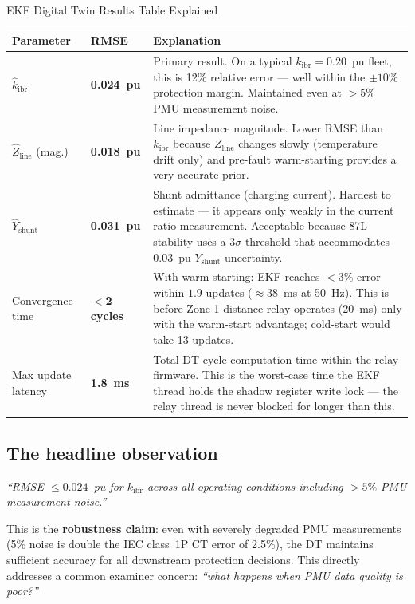 \documentclass[12pt,a4paper]{article}
\begin{document}
\begin{resultbox}{EKF Digital Twin Results Table Explained}
\begin{tabular}{@{}lp{2cm}p{7.5cm}@{}}
\toprule
\textbf{Parameter} & \textbf{RMSE} & \textbf{Explanation}\\
\midrule
$\hat{k}_\mathrm{ibr}$ & \textbf{0.024~pu} &
  Primary result. On a typical $k_\mathrm{ibr} = 0.20$~pu fleet, this is
  12\% relative error — well within the $\pm 10\%$ protection margin.
  Maintained even at $>5\%$ PMU measurement noise.\\[4pt]
$\hat{Z}_\mathrm{line}$ (mag.) & \textbf{0.018~pu} &
  Line impedance magnitude. Lower RMSE than $k_\mathrm{ibr}$ because
  $Z_\mathrm{line}$ changes slowly (temperature drift only) and pre-fault
  warm-starting provides a very accurate prior.\\[4pt]
$\hat{Y}_\mathrm{shunt}$ & \textbf{0.031~pu} &
  Shunt admittance (charging current). Hardest to estimate — it appears
  only weakly in the current ratio measurement. Acceptable because 87L
  stability uses a $3\sigma$ threshold that accommodates 0.03~pu $Y_\mathrm{shunt}$
  uncertainty.\\[4pt]
Convergence time & \textbf{$<$2 cycles} &
  With warm-starting: EKF reaches $<3\%$ error within $1.9$ updates
  ($\approx$38~ms at 50~Hz). This is before Zone-1 distance relay operates
  (20~ms) only with the warm-start advantage; cold-start would take 13 updates.\\[4pt]
Max update latency & \textbf{1.8~ms} &
  Total DT cycle computation time within the relay firmware. This is the
  worst-case time the EKF thread holds the shadow register write lock —
  the relay thread is never blocked for longer than this.\\
\bottomrule
\end{tabular}
\end{resultbox}

\subsection{The headline observation}

\emph{``RMSE $\leq 0.024$~pu for $k_\mathrm{ibr}$ across all operating conditions
including $>5\%$ PMU measurement noise.''}

This is the \textbf{robustness claim}: even with severely degraded PMU measurements
(5\% noise is double the IEC class~1P CT error of 2.5\%), the DT maintains
sufficient accuracy for all downstream protection decisions. This directly
addresses a common examiner concern: \textit{``what happens when PMU data quality
is poor?''}
\end{document}
